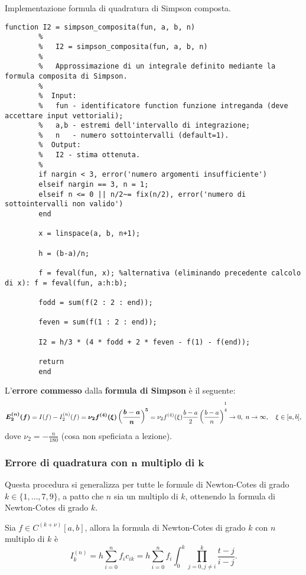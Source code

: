 \begin{algorithm}
	\caption{Implementazione formula di quadratura di Simpson composta.}\label{alg:simpson_composita}
	\begin{lstlisting}[style=Matlab-editor]
		function I2 = simpson_composita(fun, a, b, n)
		%   
		%   I2 = simpson_composita(fun, a, b, n)
		%
		%   Approssimazione di un integrale definito mediante la formula composita di Simpson.
		%
		%  Input:
		%   fun - identificatore function funzione intreganda (deve accettare input vettoriali);
		%   a,b - estremi dell'intervallo di integrazione;
		%   n   - numero sottointervalli (default=1).
		%  Output:
		%   I2 - stima ottenuta.
		%
		if nargin < 3, error('numero argomenti insufficiente')
		elseif nargin == 3, n = 1;
		elseif n <= 0 || n/2~= fix(n/2), error('numero di sottointervalli non valido')
		end
		
		x = linspace(a, b, n+1);
		
		h = (b-a)/n;
		
		f = feval(fun, x); %alternativa (eliminando precedente calcolo di x): f = feval(fun, a:h:b);
		
		fodd = sum(f(2 : 2 : end));
		
		feven = sum(f(1 : 2 : end));
		
		I2 = h/3 * (4 * fodd + 2 * feven - f(1) - f(end));
		
		return
		end
	\end{lstlisting}
\end{algorithm}

\begin{definition}
    L'\textbf{errore commesso} dalla \textbf{formula di Simpson} è il seguente:
    \begin{equation}\label{eq:errFormSimpComp}
        \boldsymbol{E_2^{(n)}(f)}=I(f)-I_2^{(n)}(f)=\boldsymbol{\nu_2 f^{(4)}(\xi)\left(\frac{b-a}{n}\right)^5} = \nu_2f^{(4)}(\xi)\frac{b-a}{2}\left(\frac{b-a}{n}\right)^{\overset{\footnotemark}{4}}\rightarrow 0,\; n\rightarrow\infty,\quad \xi\in[a,b],
    \end{equation}
    dove $\nu_2 = -\frac{n}{180}$ (cosa non speficiata a lezione).
\end{definition}

\subsubsection{Errore di quadratura con \texorpdfstring{$\boldsymbol n$}{n} multiplo di \texorpdfstring{$\boldsymbol k$}{k}}
Questa procedura si generalizza per tutte le formule di Newton-Cotes di grado $k\in\{1,\hdots, 7, 9\}$, a patto che $n$ sia un multiplo di $k$, ottenendo la formula di Newton-Cotes di grado $k$.
\begin{definition}
	Sia $f\in C^{(k+\nu)}[a,b]$, allora la formula di Newton-Cotes di grado $k$ con $n$ multiplo di $k$ è
	\begin{equation*}
    	I_k^{(n)}=h\sum_{i=0}^nf_ic_{ik}=h\sum_{i=0}^nf_i\int_0^k\prod_{j=0, j\neq i}^k\frac{t-j}{i-j}.
	\end{equation*}
\end{definition}

